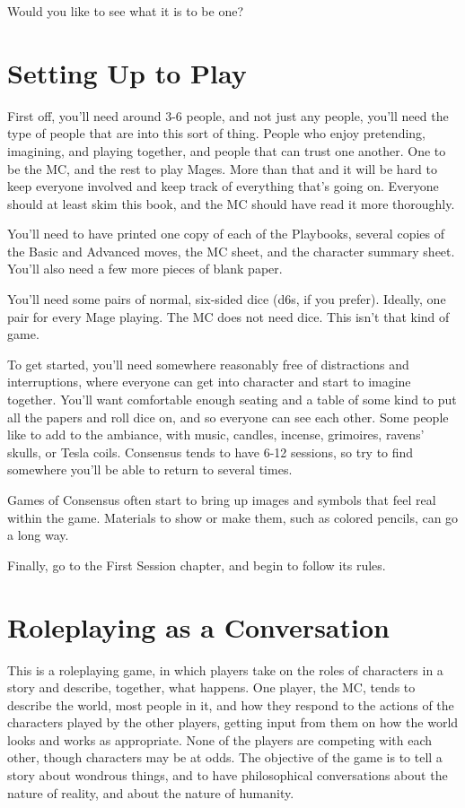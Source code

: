 \documentclass[
]{memoir}
\begin{document}
Would you like to see what it is to be one?

\hypertarget{setting-up-to-play}{%
\section{Setting Up to Play}\label{setting-up-to-play}}

First off, you'll need around 3-6 people, and not just any people,
you'll need the type of people that are into this sort of thing. People
who enjoy pretending, imagining, and playing together, and people that
can trust one another. One to be the MC, and the rest to play Mages.
More than that and it will be hard to keep everyone involved and keep
track of everything that's going on. Everyone should at least skim this
book, and the MC should have read it more thoroughly.

You'll need to have printed one copy of each of the Playbooks, several
copies of the Basic and Advanced moves, the MC sheet, and the character
summary sheet. You'll also need a few more pieces of blank paper.

You'll need some pairs of normal, six-sided dice (d6s, if you prefer).
Ideally, one pair for every Mage playing. The MC does not need dice.
This isn't that kind of game.

To get started, you'll need somewhere reasonably free of distractions
and interruptions, where everyone can get into character and start to
imagine together. You'll want comfortable enough seating and a table of
some kind to put all the papers and roll dice on, and so everyone can
see each other. Some people like to add to the ambiance, with music,
candles, incense, grimoires, ravens' skulls, or Tesla coils. Consensus
tends to have 6-12 sessions, so try to find somewhere you'll be able to
return to several times.

Games of Consensus often start to bring up images and symbols that feel
real within the game. Materials to show or make them, such as colored
pencils, can go a long way.

Finally, go to the First Session chapter, and begin to follow its rules.

\hypertarget{roleplaying-as-a-conversation}{%
\section{Roleplaying as a
Conversation}\label{roleplaying-as-a-conversation}}

This is a roleplaying game, in which players take on the roles of
characters in a story and describe, together, what happens. One player,
the MC, tends to describe the world, most people in it, and how they
respond to the actions of the characters played by the other players,
getting input from them on how the world looks and works as appropriate.
None of the players are competing with each other, though characters may
be at odds. The objective of the game is to tell a story about wondrous
things, and to have philosophical conversations about the nature of
reality, and about the nature of humanity.
\end{document}
